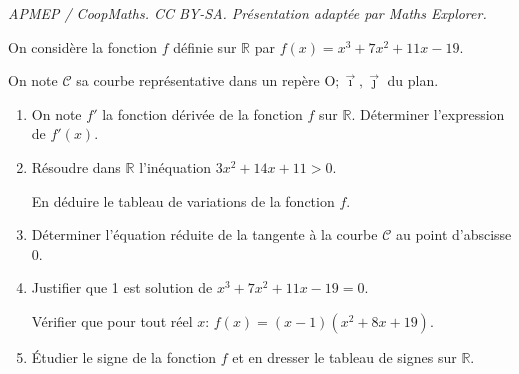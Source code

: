\documentclass[10pt]{article}
\providecommand{\R}{\mathbb{R}}
\providecommand{\Oij}{\(\mathrm{O};\vec{\imath},\vec{\jmath}\)}
\begin{document}
\noindent\textit{APMEP / CoopMaths. CC BY-SA. Présentation adaptée par Maths Explorer.}\par\medskip
\bigskip

On considère la fonction $f$ définie sur $\R$ par $f(x)=x^3 + 7x^2 +11x - 19$.

On note $\mathcal{C}$ sa courbe représentative dans un repère \Oij{} du plan.

\medskip

\begin{enumerate}
\item On note $f'$ la fonction dérivée de la fonction $f$ sur $\R$. Déterminer l'expression de $f'(x)$.
\item Résoudre dans $\R$ l'inéquation $3x^2+14x+11>0$.

En déduire le tableau de variations de la fonction $f$.
\item Déterminer l'équation réduite de la tangente à la courbe $\mathcal{C}$ au point d'abscisse $0$.
\item Justifier que 1 est solution de $x^3 + 7x^2 +11x - 19 = 0$.

Vérifier que pour tout réel $x$: $f(x) = (x-1) \left(x^2+8x+19\right)$.
\item Étudier le signe de la fonction $f$ et en dresser le tableau de signes sur $\R$.
\end{enumerate}

\vspace{0.5cm}
\end{document}
